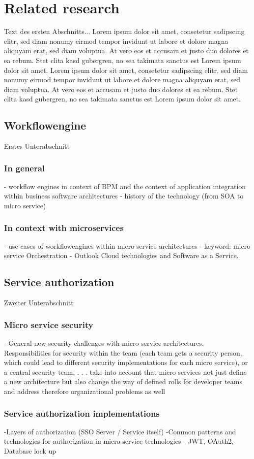 \section{Related research}\label{relatedResearch}

Text des ersten Abschnitts... Lorem ipsum dolor sit amet, consetetur sadipscing elitr, sed diam nonumy eirmod tempor invidunt ut labore et dolore magna aliquyam erat, sed diam voluptua. At vero eos et accusam et justo duo dolores et ea rebum. Stet clita kasd gubergren, no sea takimata sanctus est Lorem ipsum dolor sit amet. Lorem ipsum dolor sit amet, consetetur sadipscing elitr, sed diam nonumy eirmod tempor invidunt ut labore et dolore magna aliquyam erat, sed diam voluptua. At vero eos et accusam et justo duo dolores et ea rebum. Stet clita kasd gubergren, no sea takimata sanctus est Lorem ipsum dolor sit amet.

\subsection{Workflowengine}\label{wf}

Erstes Unterabschnitt

\subsubsection{In general}\label{wfInGeneral}
- workflow engines in context of BPM and the context of application integration within business
software architectures
- history of the technology (from SOA to micro service)


\subsubsection{In context with microservices}\label{wfInContextWithMS}
- use cases of workflowengines within micro service architectures
- keyword: micro service Orchestration
- Outlook Cloud technologies and Software as a Service.



\subsection{Service authorization}\label{serviceAuthorization}

Zweiter Unterabschnitt

\subsubsection{Micro service security}\label{msSecurity}
- General new security challenges with micro service architectures. Responsibilities for security within the team (each team gets a security person, which could lead to different security implementations for each micro service), or a central security team, . . . take into account that micro services not just define a new architecture but also change the way of defined rolls for developer teams and address therefore organizational problems as well

\subsubsection{Service authorization implementations}\label{serviceAuthorizationImplementations}
-Layers of authorization (SSO Server / Service itself)
-Common patterns and technologies for authorization in micro service technologies
- JWT, OAuth2, Database lock up

